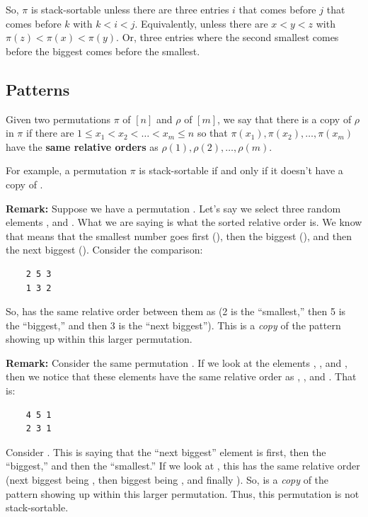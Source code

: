 \documentclass[letterpaper]{article}
\begin{document}
So, $\pi$ is stack-sortable unless there are three entries $i$ that comes before $j$ that comes before $k$ with $k < i < j$. Equivalently, unless there are $x < y < z$ with $\pi(z) < \pi(x) < \pi(y)$. Or, three entries where the second smallest comes before the biggest comes before the smallest. 

\subsection{Patterns}
\begin{definition}{}{}
    Given two permutations $\pi$ of $[n]$ and $\rho$ of $[m]$, we say that there is a copy of $\rho$ in $\pi$ if there are $1 \leq x_1 < x_2 < \dots < x_m \leq n$ so that $\pi(x_1), \pi(x_2), \dots, \pi(x_m)$ have the \textbf{same relative orders} as $\rho(1), \rho(2), \dots, \rho(m)$. 
\end{definition}
For example, a permutation $\pi$ is stack-sortable if and only if it doesn't have a copy of . 

\bigskip 

\textbf{Remark:} Suppose we have a permutation . Let's say we select three random elements ,  and . What we are saying is what the sorted relative order is. We know that  means that the smallest number goes first (), then the biggest (), and then the next biggest (). Consider the comparison:
\begin{verbatim}
    2 5 3
    1 3 2
\end{verbatim}
So,  has the same relative order between them as  (2 is the ``smallest,'' then 5 is the ``biggest,'' and then 3 is the ``next biggest''). This  is a \emph{copy} of the pattern  showing up within this larger permutation.

\bigskip 

\textbf{Remark:} Consider the same permutation . If we look at the elements , , and , then we notice that these elements have the same relative order as , , and . That is:
\begin{verbatim}
    4 5 1
    2 3 1
\end{verbatim}
Consider . This is saying that the ``next biggest'' element is first, then the ``biggest,'' and then the ``smallest.'' If we look at , this has the same relative order (next biggest being , then biggest being , and finally ). So,  is a \emph{copy} of the pattern  showing up within this larger permutation. Thus, this permutation is not stack-sortable. 
\end{document}
